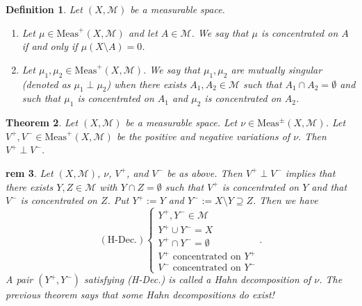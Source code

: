 \documentclass[letterpaper, 12pt]{article}
\newcommand{\fin}{\qquad \quad \hfill \framebox[1.75mm][l]{\,}}
\newcommand{\cM}{\mathcal{M}}
\newcommand{\Meas}{\mathrm{Meas}}
\theoremstyle{stdthm}
\newtheorem{thm}{Theorem}[section]
\theoremstyle{stddef}
\newtheorem{defn}[thm]{Definition}
\newtheorem{rem}[thm]{rem} %
\theoremstyle{stdnonum}
\theoremstyle{stdqands}
\theoremstyle{stdbold}
\begin{document}
\begin{defn}
Let $(X,\cM)$ be a measurable space.
\begin{enumerate}
\item Let $\mu\in \Meas^+(X,\cM)$ and let $A\in\cM$. We say that $\mu$ is concentrated on $A$ if and only if $\mu(X\setminus A) = 0$.
\item Let $\mu_1,\mu_2\in \Meas^+(X,\cM)$. We say that $\mu_1,\mu_2$ are mutually singular (denoted as $\mu_1 \perp \mu_2$) when there exists $A_1,A_2\in\cM$ such that $A_1\cap A_2 = \emptyset$ and such that $\mu_1$ is concentrated on $A_1$ and $\mu_2$ is concentrated on $A_2$.
\end{enumerate}
\end{defn}

\begin{thm}
Let $(X,\cM)$ be a measurable space. Let $\nu\in\Meas^\pm(X,\cM)$. Let $V^+,V^-\in\Meas^+(X,\cM)$ be the positive and negative variations of $\nu$. Then $V^+ \perp V^-$.
\end{thm}

\begin{rem}
Let $(X,\cM)$, $\nu$, $V^+$, and $V^-$ be as above. Then $V^+ \perp V^-$ implies that there exists $Y,Z\in\cM$ with $Y\cap Z = \emptyset$ such that $V^+$ is concentrated on $Y$ and that $V^-$ is concentrated on $Z$. Put $Y^+:=Y$ and $Y^-:=X\setminus Y\supseteq Z$. Then we have
\[
(\mbox{H-Dec.})\left\{
\begin{array}{c}
Y^+,Y^-\in\cM\\
Y^+ \cup Y^- = X\\
Y^+ \cap Y^- = \emptyset\\
V^+ \mbox{ concentrated on } Y^+\\
V^- \mbox{ concentrated on } Y^-
\end{array}
\right..
\]
A pair $(Y^+,Y^-)$ satisfying (H-Dec.) is called a Hahn decomposition of $\nu$. The previous theorem says that some Hahn decompositions do exist!
\end{rem}
\end{document}

